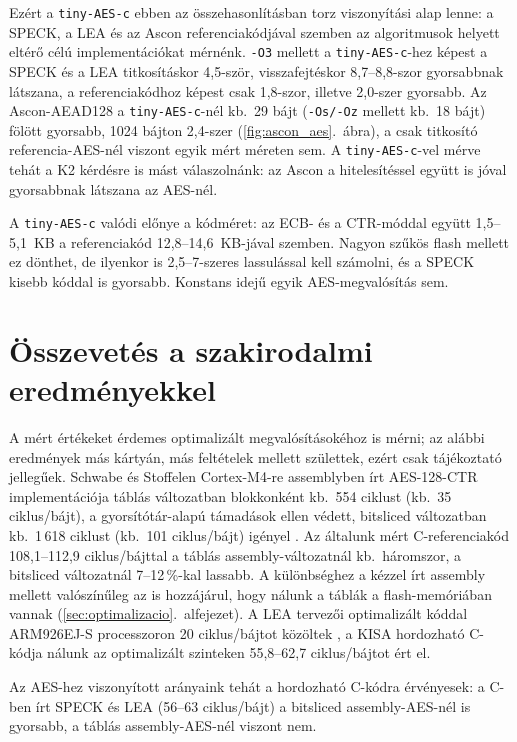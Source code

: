 \documentclass[a4paper,12pt]{report}
\theoremstyle{definition}
\theoremstyle{remark}
\begin{document}
Ezért a \texttt{tiny-AES-c} ebben az összehasonlításban torz viszonyítási alap lenne: a SPECK, a LEA és az Ascon referenciakódjával szemben az algoritmusok helyett eltérő célú implementációkat mérnénk. \texttt{-O3} mellett a \texttt{tiny-AES-c}-hez képest a SPECK és a LEA titkosításkor 4,5-ször, visszafejtéskor 8,7--8,8-szor gyorsabbnak látszana, a referenciakódhoz képest csak 1,8-szor, illetve 2,0-szer gyorsabb. Az Ascon-AEAD128 a \texttt{tiny-AES-c}-nél kb.\ 29 bájt (\texttt{-Os/-Oz} mellett kb.\ 18 bájt) fölött gyorsabb, 1024 bájton 2,4-szer (\ref{fig:ascon_aes}.~ábra), a csak titkosító referencia-AES-nél viszont egyik mért méreten sem. A \texttt{tiny-AES-c}-vel mérve tehát a K2 kérdésre is mást válaszolnánk: az Ascon a hitelesítéssel együtt is jóval gyorsabbnak látszana az AES-nél.

A \texttt{tiny-AES-c} valódi előnye a kódméret: az ECB- és a CTR-móddal együtt 1,5--5,1~KB a referenciakód 12,8--14,6~KB-jával szemben. Nagyon szűkös flash mellett ez dönthet, de ilyenkor is 2,5--7-szeres lassulással kell számolni, és a SPECK kisebb kóddal is gyorsabb. Konstans idejű egyik AES-megvalósítás sem.

\section{Összevetés a szakirodalmi eredményekkel}\label{sec:irodalmi_osszevetes}

A mért értékeket érdemes optimalizált megvalósításokéhoz is mérni; az alábbi eredmények más kártyán, más feltételek mellett születtek, ezért csak tájékoztató jellegűek. Schwabe és Stoffelen Cortex-M4-re assemblyben írt AES-128-CTR implementációja táblás változatban blokkonként kb.\ 554 ciklust (kb.\ 35 ciklus/bájt), a gyorsítótár-alapú támadások ellen védett, bitsliced változatban kb.\ 1\,618 ciklust (kb.\ 101 ciklus/bájt) igényel \cite{SchwabeStoffelen2017}. Az általunk mért C-referenciakód 108,1--112,9 ciklus/bájttal a táblás assembly-változatnál kb.\ háromszor, a bitsliced változatnál 7--12\,\%-kal lassabb. A különbséghez a kézzel írt assembly mellett valószínűleg az is hozzájárul, hogy nálunk a táblák a flash-memóriában vannak (\ref{sec:optimalizacio}.~alfejezet). A LEA tervezői optimalizált kóddal ARM926EJ-S processzoron 20 ciklus/bájtot közöltek \cite{Hong2013}, a KISA hordozható C-kódja nálunk az optimalizált szinteken 55,8--62,7 ciklus/bájtot ért el.

Az AES-hez viszonyított arányaink tehát a hordozható C-kódra érvényesek: a C-ben írt SPECK és LEA (56--63 ciklus/bájt) a bitsliced assembly-AES-nél is gyorsabb, a táblás assembly-AES-nél viszont nem.
\end{document}
